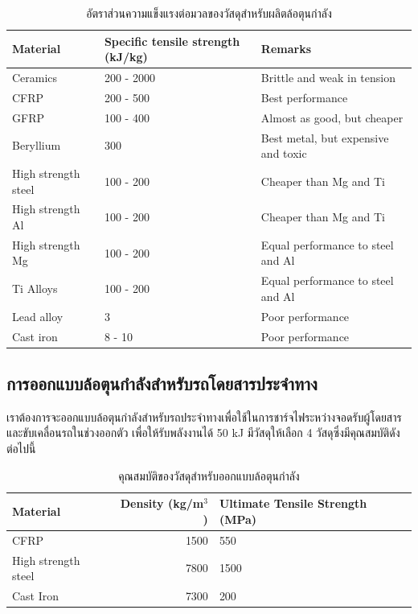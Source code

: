 \documentclass[a4paper,nobib,openany]{tufte-book}
\begin{document}
\begin{table}[htbp]
\caption{อัตราส่วนความแข็งแรงต่อมวลของวัสดุสำหรับผลิตล้อตุนกำลัง}
\centering
\begin{tabular}{p{2.5cm}p{3cm}p{3.5cm}}
\toprule
Material & Specific tensile strength (kJ/kg) & Remarks\\
\midrule
Ceramics & 200 - 2000 & Brittle and weak in tension\\
CFRP & 200 - 500 & Best performance\\
GFRP & 100 - 400 & Almost as good, but cheaper\\
Beryllium & 300 & Best metal, but expensive and toxic\\
High strength steel & 100 - 200 & Cheaper than Mg and Ti\\
High strength Al & 100 - 200 & Cheaper than Mg and Ti\\
High strength Mg & 100 - 200 & Equal performance to steel and Al\\
Ti Alloys & 100 - 200 & Equal performance to steel and Al\\
Lead alloy & 3 & Poor performance\\
Cast iron & 8 - 10 & Poor performance\\
\bottomrule
\end{tabular}
\end{table}

\subsection{การออกแบบล้อตุนกำลังสำหรับรถโดยสารประจำทาง}
\label{sec:org07f2140}

เราต้องการจะออกแบบล้อตุนกำลังสำหรับรถประจำทางเพื่อใช้ในการชาร์จไฟระหว่างจอดรับผู้โดยสาร
และขับเคลื่อนรถในช่วงออกตัว เพื่อให้รับพลังงานได้ 50 kJ มีวัสดุให้เลือก
4 วัสดุซึ่งมีคุณสมบัติดังต่อไปนี้

\begin{table}[htbp]
\caption{คุณสมบัติของวัสดุสำหรับออกแบบล้อตุนกำลัง}
\centering
\begin{tabular}{lrp{3cm}}
\toprule
Material & Density (kg/m\(^{\text{3}}\)) & Ultimate Tensile Strength (MPa)\\
\midrule
CFRP & 1500 & 550\\
High strength steel & 7800 & 1500\\
Cast Iron & 7300 & 200\\
\bottomrule
\end{tabular}
\end{table}
\end{document}
